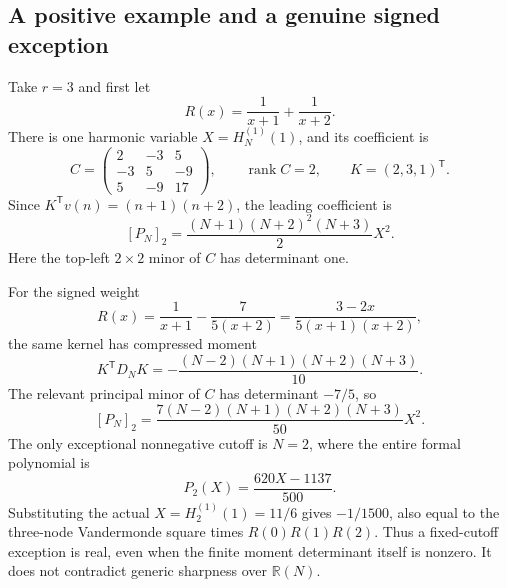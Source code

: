 \subsection{A positive example and a genuine signed exception}

Take $r=3$ and first let
\[
 R(x)=\frac1{x+1}+\frac1{x+2}.
\]
There is one harmonic variable $X=H_N^{(1)}(1)$, and its coefficient is
\[
 C=\begin{pmatrix}2&-3&5\\-3&5&-9\\5&-9&17\end{pmatrix},
 \qquad \operatorname{rank}C=2,
 \qquad K=(2,3,1)^{\mathsf T}.
\]
Since $K^{\mathsf T}v(n)=(n+1)(n+2)$, the leading coefficient is
\begin{equation}\label{deg:positive-example}
 [P_N]_2=\frac{(N+1)(N+2)^2(N+3)}2 X^2.
\end{equation}
Here the top-left $2\times2$ minor of $C$ has determinant one.

For the signed weight
\begin{equation}\label{deg:signed-weight}
 R(x)=\frac1{x+1}-\frac7{5(x+2)}
     =\frac{3-2x}{5(x+1)(x+2)},
\end{equation}
the same kernel has compressed moment
\[
 K^{\mathsf T}D_NK
 =-\frac{(N-2)(N+1)(N+2)(N+3)}{10}.
\]
The relevant principal minor of $C$ has determinant $-7/5$, so
\begin{equation}\label{deg:signed-leading}
 [P_N]_2=\frac{7(N-2)(N+1)(N+2)(N+3)}{50}X^2.
\end{equation}
The only exceptional nonnegative cutoff is $N=2$, where the entire
formal polynomial is
\begin{equation}\label{deg:signed-exception}
 P_2(X)=\frac{620X-1137}{500}.
\end{equation}
Substituting the actual $X=H_2^{(1)}(1)=11/6$ gives $-1/1500$, also
equal to the three-node Vandermonde square times
$R(0)R(1)R(2)$.  Thus a fixed-cutoff exception is real, even when the
finite moment determinant itself is nonzero.  It does not contradict
generic sharpness over $\mathbb R(N)$.
